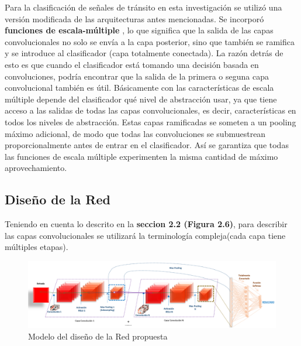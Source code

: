 	Para la clasificación de señales de tránsito en esta investigación se utilizó una versión modificada de las arquitecturas antes mencionadas. Se incorporó {\bf funciones de escala-múltiple} \citep{Multi_scale_feat}, lo que significa que la salida de las capas convolucionales no solo se envía a la capa posterior, sino que también se ramifica y se introduce al clasificador (capa totalmente conectada). La razón detrás de esto es que cuando el clasificador está tomando una decisión basada en convoluciones, podría encontrar que la salida de la primera o seguna capa convolucional también es útil. Básicamente con las características de escala múltiple depende del clasificador qué nivel de abstracción usar, ya que tiene acceso a las salidas de todas las capas convolucionales, es decir, características en todos los niveles de abstracción. Estas capas ramificadas se someten a un pooling máximo adicional, de modo que todas las convoluciones se submuestrean proporcionalmente antes de entrar en el clasificador. Así se garantiza que todas las funciones de escala múltiple experimenten la misma cantidad de máximo aprovechamiento.
	
	\subsection{Diseño de la Red}
	
	Teniendo en cuenta lo descrito en la {\bf seccion 2.2 (Figura 2.6)}, para describir las capas convolucionales se utilizará la terminología compleja(cada capa tiene múltiples etapas).
	
		\begin{figure}[H]
		\includegraphics[width=1\textwidth]{images/desarrollo/networkArquitec/designNet}
		\begin{center}
		\caption{\small{Modelo del diseño de la Red propuesta}}
		{\small{\fontsize{10}{16.8}\selectfont {Fuente: Elaboración propia}}}
		\end{center}
		\vspace{-1.5em}
		\end{figure}

